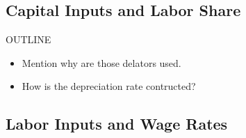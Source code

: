 \documentclass[12pt]{article}
\begin{document}
\subsection{Capital Inputs and Labor Share}\label{subsec:capital-inputs-labor-share}
OUTLINE
\begin{itemize}
	\item Mention why are those delators used.
	\item How is the depreciation rate contructed?
\end{itemize}


\subsection{Labor Inputs and Wage Rates}\label{subsec:labor-inputs-wage-rates}



\end{document}
